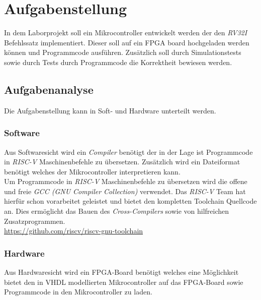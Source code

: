 \section{Aufgabenstellung}
    In dem Laborprojekt soll ein Mikrocontroller entwickelt werden der den \textit{RV32I} Befehlssatz implementiert.
    Dieser soll auf ein FPGA board hochgeladen werden können und Programmcode ausführen.
    Zusätzlich soll durch Simulationstests sowie durch Tests durch Programmcode die Korrektheit
    bewiesen werden.

    \subsection{Aufgabenanalyse}
        Die Aufgabenstellung kann in Soft- und Hardware unterteilt werden.

        \subsubsection{Software}
            Aus Softwaresicht wird ein \textit{Compiler} benötigt der in der Lage ist Programmcode
            in \textit{RISC-V} Maschinenbefehle zu übersetzen. Zusätzlich wird ein Dateiformat benötigt
            welches der Mikrocontroller interpretieren kann.
            \\
            Um Programmcode in \textit{RISC-V} Maschinenbefehle zu übersetzen wird die 
            offene und freie \textit{GCC (GNU Compiler Collection)} verwendet.
            Das \textit{RISC-V} Team hat hierfür schon vorarbeitet geleistet und bietet
            den kompletten Toolchain Quellcode an.
            Dies ermöglicht das Bauen des \textit{Cross-Compilers} sowie von hilfreichen Zusatzprogrammen.
            \\
            \url{https://github.com/riscv/riscv-gnu-toolchain}

        \subsubsection{Hardware}
            Aus Hardwaresicht wird ein FPGA-Board benötigt welches eine Möglichkeit bietet
            den in VHDL modellierten Mikrocontroller auf das FPGA-Board sowie Programmcode
            in den Mikrocontroller zu laden.
